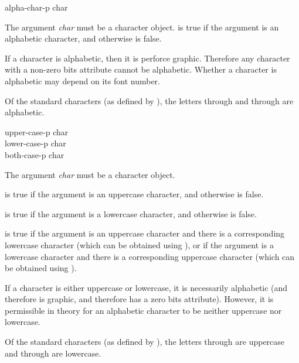 \begin{defun}[Function]
alpha-char-p char

The argument \emph{char} must be a character object.
 is true if the argument is an alphabetic
character, and otherwise is false.

If a character is alphabetic, then it is perforce graphic.
Therefore any character with a non-zero bits attribute cannot be alphabetic.
Whether a character is alphabetic may depend on its font number.

Of the standard characters (as defined by ),
the letters  through  and  through  are alphabetic.
\end{defun}

\begin{defun}[Function]
upper-case-p char \\
lower-case-p char \\
both-case-p char

The argument \emph{char} must be a character object.

 is true if the argument is an uppercase
character, and otherwise is false.

 is true if the argument is a lowercase
character, and otherwise is false.

 is true if the argument is an uppercase character and
there is a corresponding lowercase character (which can be obtained
using ), or if the argument is a lowercase character and
there is a corresponding uppercase character (which can be obtained
using ).

If a character is either uppercase or lowercase, it is necessarily
alphabetic (and therefore is graphic, and therefore has a zero bits
attribute).  However, it is permissible in theory for an alphabetic
character to be neither uppercase nor lowercase.

Of the standard characters (as defined by ),
the letters  through  are uppercase and 
through  are lowercase.
\end{defun}

